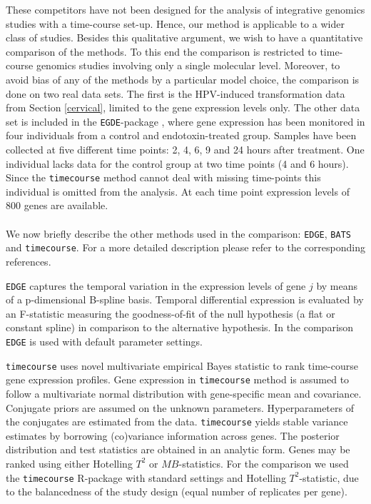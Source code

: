 These competitors have not been designed for the analysis of integrative genomics studies with a time-course set-up. Hence, our method is applicable to a wider class of studies. Besides this qualitative argument, we wish to have a quantitative comparison of the methods. To this end the comparison is restricted to time-course genomics studies involving only a single molecular level. Moreover, to avoid bias of any of the methods by a particular model choice, the comparison is done on two real data sets. The first is the HPV-induced transformation data from Section \ref{cervical}, limited to the gene expression levels only. The other data set is included in the {\tt EGDE}-package \cite{Storey2005}, where gene expression has been monitored in four individuals from a control and endotoxin-treated group. Samples have been collected at five different time points: 2, 4, 6, 9 and 24 hours after treatment. One individual lacks data for the control group at two time points (4 and 6 hours). Since the {\tt timecourse} method cannot deal with missing time-points this individual is omitted from the analysis. At each time point expression levels of 800 genes are available.
\\
\\
We now briefly describe the other methods used in the comparison: {\tt EDGE}, {\tt BATS} and {\tt timecourse}. For a more detailed description please refer to the corresponding references.

{\tt EDGE} \cite{Storey2005} captures the temporal variation in the  expression levels of gene $j$ by means of a p-dimensional B-spline basis. Temporal differential expression is evaluated by an F-statistic measuring the goodness-of-fit of the null hypothesis (a flat or constant spline) in comparison to the alternative hypothesis. In the comparison {\tt EDGE} is used with default parameter settings.

{\tt timecourse} \cite{Tai2006} uses novel multivariate empirical Bayes statistic to rank time-course gene expression profiles. Gene expression in {\tt timecourse} method is assumed to follow a multivariate normal distribution with gene-specific mean and covariance. Conjugate priors are assumed on the unknown parameters. Hyperparameters of the conjugates are estimated from the data. {\tt timecourse} yields stable variance estimates by borrowing (co)variance information across genes. The posterior distribution and test statistics are obtained in an analytic form. Genes may be ranked using either Hotelling $T^2$ or $MB$-statistics. For the comparison we used the {\tt timecourse} R-package with standard settings and Hotelling $T^2$-statistic, due to the balancedness of the study design (equal number of replicates per gene).

